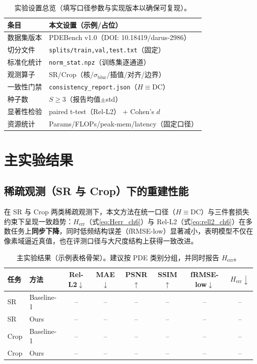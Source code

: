 \begin{table}[t]
\centering
\caption{实验设置总览（填写口径参数与实现版本以确保可复现）。}
\label{tab:exp_settings}
\begin{tabular}{ll}
\toprule
条目 & 本文设置（示例/占位）\\
\midrule
数据集版本 & PDEBench v1.0（DOI: 10.18419/darus-2986）\\
切分文件 & \texttt{splits/train,val,test.txt}（固定）\\
标准化统计 & \texttt{norm\_stat.npz}（训练集逐通道）\\
观测算子 & SR/Crop（核/$\sigma_{\text{blur}}$/插值/对齐/边界）\\
一致性门禁 & \texttt{consistency\_report.json}（$H\equiv \mathrm{DC}$）\\
种子数 & $S\ge 3$（报告均值$\pm$std）\\
显著性检验 & paired t-test（Rel-L2） + Cohen's $d$\\
资源统计 & Params/FLOPs/peak-mem/latency（固定口径）\\
\bottomrule
\end{tabular}
\end{table}

\section{主实验结果}\label{sec:main_results}

\subsection{稀疏观测（SR 与 Crop）下的重建性能}\label{sec:main_sr_crop}

在 SR 与 Crop 两类稀疏观测下，本文方法在统一口径（$H\equiv \mathrm{DC}$）与三件套损失约束下呈现一致趋势：$H_{\mathrm{err}}$（式\eqref{eq:Herr_ch6}）与 Rel-L2（式\eqref{eq:rell2_ch6}）在多数任务上\textbf{同步下降}，同时低频结构误差（fRMSE-low）显著减小，表明模型不仅在像素域逼近真值，也在评测口径与大尺度结构上获得一致改进。

\begin{table}[t]
\centering
\caption{主实验结果（示例表格骨架）。建议按 PDE 类别分组，并同时报告 $H_{\mathrm{err}}$。}
\label{tab:main_results}
\begin{tabular}{llcccccc}
\toprule
任务 & 方法 & Rel-L2$\downarrow$ & MAE$\downarrow$ & PSNR$\uparrow$ & SSIM$\uparrow$ & fRMSE-low$\downarrow$ & $H_{\mathrm{err}}\downarrow$\\
\midrule
SR & Baseline-1 & -- & -- & -- & -- & -- & --\\
SR & Ours & -- & -- & -- & -- & -- & --\\
\midrule
Crop & Baseline-1 & -- & -- & -- & -- & -- & --\\
Crop & Ours & -- & -- & -- & -- & -- & --\\
\bottomrule
\end{tabular}
\end{table}

